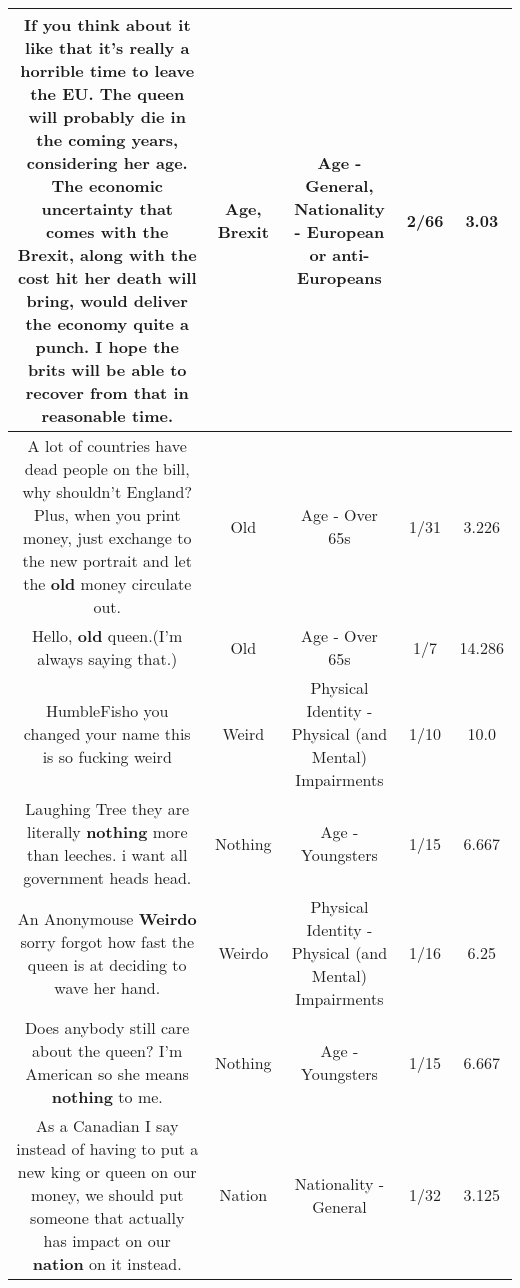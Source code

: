 \documentclass[11pt]{article}
\newlength\mylength
\begin{document}
\begin{center}
\begin{longtable}{|C{.65\mylength}|C{.30\mylength}|C{.12\mylength}|C{.12\mylength}|C{.12\mylength}|}
  \small If you think about it like that it's really a horrible time to leave the EU. The queen will probably die in the coming years, considering her \textbf{age}. The economic uncertainty that comes with the \textbf{Brexit}, along with the cost hit her death will bring, would deliver the economy quite a punch. I hope the brits will be able to recover from that in reasonable time.\normalsize   & Age, Brexit & Age - General, Nationality - European or anti-Europeans & 2/66 & 3.03 \\  \hline
  \small A lot of countries have dead people on the bill, why shouldn't England? Plus, when you print money, just exchange to the new portrait and let the \textbf{old} money circulate out.\normalsize   & Old & Age - Over 65s & 1/31 & 3.226 \\  \hline
  \small Hello, \textbf{old} queen.(I'm always saying that.)\normalsize   & Old & Age - Over 65s & 1/7 & 14.286 \\  \hline
  \small HumbleFisho you changed your name this is so fucking weird\normalsize   & Weird & Physical Identity - Physical (and Mental) Impairments & 1/10 & 10.0 \\  \hline
  \small Laughing Tree they are literally \textbf{nothing} more than leeches. i want all government heads head.\normalsize   & Nothing & Age - Youngsters & 1/15 & 6.667 \\  \hline
  \small An Anonymouse \textbf{Weirdo} sorry forgot how fast the queen is at deciding to wave her hand.\normalsize   & Weirdo & Physical Identity - Physical (and Mental) Impairments & 1/16 & 6.25 \\  \hline
  \small Does anybody still care about the queen? I'm American so she means \textbf{nothing} to me.\normalsize   & Nothing & Age - Youngsters & 1/15 & 6.667 \\  \hline
  \small As a Canadian I say instead of having to put a new king or queen on our money, we should put someone that actually has impact on our \textbf{nation} on it instead.\normalsize   & Nation & Nationality - General & 1/32 & 3.125 \\  \hline

\end{longtable}
\end{center}
\end{document}
